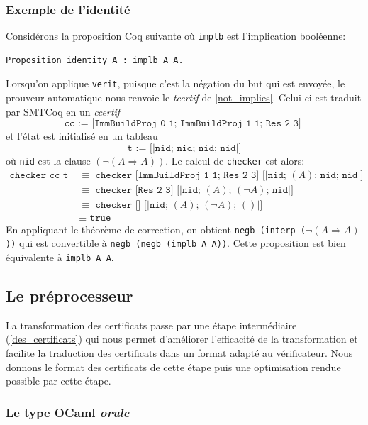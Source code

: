 \documentclass[11pt]{article}
\begin{document}
\subsubsection{Exemple de l'identité} \label{id_exemple}

Considérons la proposition Coq suivante où \texttt{implb} est l'implication booléenne:
\begin{lstlisting}[frame=single]
  Proposition identity A : implb A A.
\end{lstlisting}

Lorsqu'on applique \texttt{verit}, puisque c'est la négation du but qui est envoyée, le prouveur automatique nous renvoie le \textit{tcertif} de \ref{not_implies}. Celui-ci est traduit par SMTCoq en un \textit{ccertif}
\[ \texttt{cc := [ImmBuildProj 0 1; ImmBuildProj 1 1; Res 2 3] } \]
et l'état est initialisé en un tableau 
\[\texttt{t := [|nid; nid; nid; nid|]}\] 
où \texttt{nid} est la clause $(\neg (A \Rightarrow A))$.
Le calcul de \texttt{checker} est alors:
\begin{align*}
  \texttt{checker cc t}\,\, &\equiv \,\, \texttt{checker [ImmBuildProj 1 1; Res 2 3] [|nid; }(A)\texttt{; nid; nid|]} \\
    &\equiv \,\, \texttt{checker [Res 2 3] [|nid; }(A)\texttt{; }(\neg A)\texttt{; nid|]} \\
    &\equiv \,\, \texttt{checker [] [|nid; }(A)\texttt{; }(\neg A)\texttt{; }()\texttt{|]} \\
    &\equiv \,\, \texttt{true}
\end{align*}
En appliquant le théorème de correction, on obtient \texttt{negb (interp (}$\neg (A \Rightarrow A)$\texttt{))} qui est convertible à \texttt{negb (negb (implb A A))}. Cette proposition est bien équivalente à \texttt{implb A A}.

\subsection{Le préprocesseur}

La transformation des certificats passe par une étape intermédiaire (\ref{des_certificats}) qui nous permet d'améliorer l'efficacité de la transformation et facilite la traduction des certificats dans un format adapté au vérificateur. Nous donnons le format des certificats de cette étape puis une optimisation rendue possible par cette étape.

\subsubsection{Le type OCaml \textit{orule}}
\end{document}
